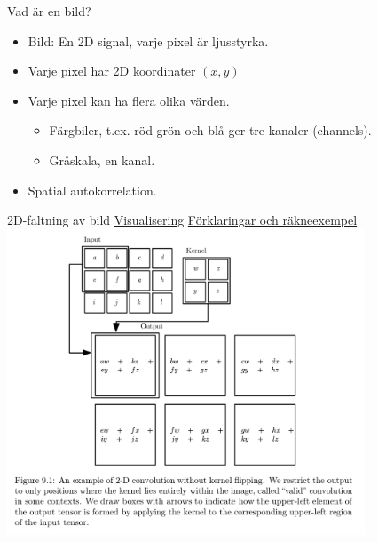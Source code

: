 \documentclass[10pt,english]{beamer}
\begin{document}
\begin{frame}{Vad är en bild?}

    \begin{itemize}
        \item Bild: En 2D signal, varje pixel är ljusstyrka.
        \item Varje pixel har 2D koordinater $(x,y)$
        \item Varje pixel kan ha flera olika värden.
        \begin{itemize}
            \item Färgbiler, t.ex. röd grön och blå ger tre kanaler (channels).
            \item Gråskala, en kanal.
        \end{itemize}
        \item Spatial autokorrelation.
    \end{itemize}
    
\end{frame}

\begin{frame}{2D-faltning av bild}
    \href{https://ezyang.github.io/convolution-visualizer/}{Visualisering} \href{https://towardsdatascience.com/visualizing-the-fundamentals-of-convolutional-neural-networks-6021e5b07f69}{Förklaringar och räkneexempel}
    \includegraphics[width = 0.8\textwidth]{figs/2-D convolution.png}
\end{frame}
\end{document}
